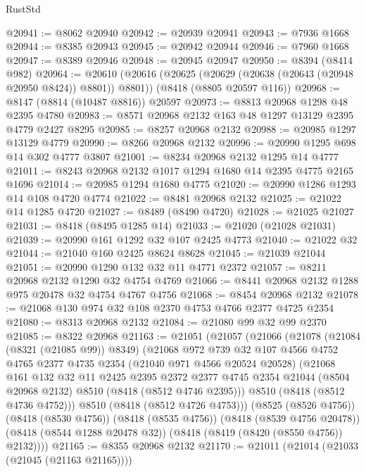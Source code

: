 \begin{lexlean}{RustStd}
\begin{coremodule}
@20941 := @8062 @20940
@20942 := @20939 @20941
@20943 := @7936 @1668
@20944 := @8385 @20943
@20945 := @20942 @20944
@20946 := @7960 @1668
@20947 := @8389 @20946
@20948 := @20945 @20947
@20950 := @8394 (@8414 @982)
@20964 := @20610
    (@20616 (@20625 (@20629 (@20638 (@20643 (@20948 @20950 @8424)) @8801)) @8801))
    (@8418 (@8805 @20597 @116))
@20968 := @8147 (@8814 (@10487 @8816)) @20597
@20973 := @8813 @20968 @1298 @48 @2395 @4780
@20983 := @8571 @20968 @2132 @163 @48 @1297 @13129 @2395 @4779 @2427 @8295
@20985 := @8257 @20968 @2132
@20988 := @20985 @1297 @13129 @4779
@20990 := @8266 @20968 @2132
@20996 := @20990 @1295 @698 @14 @302 @4777 @3807
@21001 := @8234 @20968 @2132 @1295 @14 @4777
@21011 := @8243 @20968 @2132 @1017 @1294 @1680 @14 @2395 @4775 @2165 @1696
@21014 := @20985 @1294 @1680 @4775
@21020 := @20990 @1286 @1293 @14 @108 @4720 @4774
@21022 := @8481 @20968 @2132
@21025 := @21022 @14 @1285 @4720
@21027 := @8489 (@8490 @4720)
@21028 := @21025 @21027
@21031 := @8418 (@8495 @1285 @14)
@21033 := @21020 (@21028 @21031)
@21039 := @20990 @161 @1292 @32 @107 @2425 @4773
@21040 := @21022 @32
@21044 := @21040 @160 @2425 @8624 @8628
@21045 := @21039 @21044
@21051 := @20990 @1290 @132 @32 @11 @4771 @2372
@21057 := @8211 @20968 @2132 @1290 @32 @4754 @4769
@21066 := @8441 @20968 @2132 @1288 @975 @20478 @32 @4754 @4767 @4756
@21068 := @8454 @20968 @2132
@21078 := @21068 @130 @974 @32 @108 @2370 @4753 @4766 @2377 @4725 @2354
@21080 := @8313 @20968 @2132
@21084 := @21080 @99 @32 @99 @2370
@21085 := @8322 @20968
@21163 := @21051
    (@21057
      (@21066
        (@21078
          (@21084 (@8321 (@21085 @99)) @8349)
          (@21068
            @972
            @739
            @32
            @107
            @4566
            @4752
            @4765
            @2377
            @4735
            @2354
            (@21040 @971 @4566 @20524 @20528)
            (@21068
              @161
              @132
              @32
              @11
              @2425
              @2395
              @2372
              @2377
              @4745
              @2354
              @21044
              (@8504 @20968 @2132)
              @8510
              (@8418 (@8512 @4746 @2395)))
            @8510
            (@8418 (@8512 @4736 @4752)))
          @8510
          (@8418 (@8512 @4726 @4753)))
        (@8525 (@8526 @4756))
        (@8418 (@8530 @4756))
        (@8418 (@8535 @4756))
        (@8418 (@8539 @4756 @20478))
        (@8418 (@8544 @1288 @20478 @32))
        (@8418 (@8419 (@8420 (@8550 @4756)) @2132))))
@21165 := @8355 @20968 @2132
@21170 := @21011 (@21014 (@21033 (@21045 (@21163 @21165))))

\end{coremodule}
\end{lexlean}
